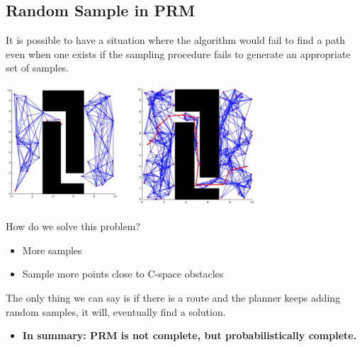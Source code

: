 \documentclass[10pt]{article}
\begin{document}
\subsection*{Random Sample in PRM}
It is possible to have a situation where the algorithm would fail to find a path even when one exists if the sampling procedure fails to generate an appropriate set of samples.
\begin{center} 
    \includegraphics*[width=0.7\textwidth]{L1_10.png} 
\end{center}
How do we solve this problem?
\begin{itemize}
	\item More samples
	\item Sample more points close to C-space obstacles
\end{itemize}
The only thing we can say is if there is a route and the planner keeps adding random samples, it will, eventually find a solution.
\begin{itemize}
	\item \textbf{In summary: PRM is not complete, but probabilistically complete.}
\end{itemize}
\end{document}

